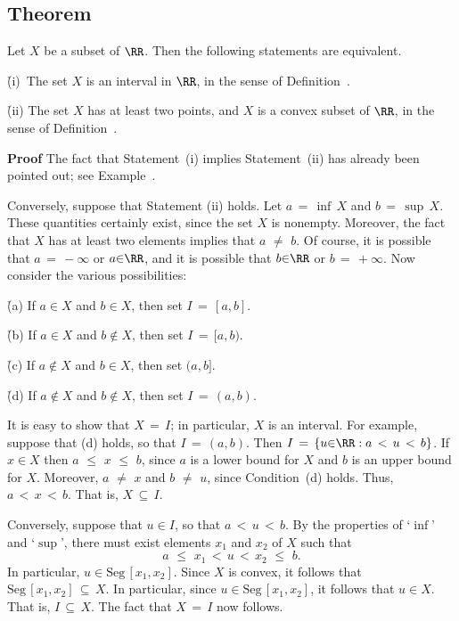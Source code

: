\V

            \subsection{\small{\bf Theorem}}
            \label{ThmB30.160}

\V

        Let $X$ be a subset of ${\RR}$. Then the following statements are equivalent.

        \h (i)\, The set $X$ is an interval in ${\RR}$, in the sense of Definition~.

        \h (ii) The set $X$ has at least two points, and $X$ is a convex subset of ${\RR}$, in the sense of Definition~.

\V

        {\bf Proof} The fact that Statement~(i) implies Statement~(ii) has already been pointed out; see Example~.

        Conversely, suppose that Statement (ii) holds. Let $a \,=\, {\inf}\,X$ and $b \,=\, {\sup}\,X$.
    These quantities certainly exist, since the set $X$ is nonempty. Moreover, the fact that $X$ has at least two elements implies that $a \,\,{\neq}\,\, b$.
    Of course, it is possible that $a \,=\, -{\infty}$ or $a{\in}{\RR}$, and it is possible that $b{\in}{\RR}$ or $b \,=\, +{\infty}$.
    Now consider the various possibilities:

    \h (a) If $a{\in}X$ and $b{\in}X$, then set $I \,=\, [a,b]$.

    \h (b) If $a{\in}X$ and $b \not \in X$, then set $I \,=\, [a,b)$.

    \h (c) If $a \not \in X$ and $b{\in}X$, then set $(a,b]$.

    \h (d) If $a \not \in X$ and $b \not \in X$, then set $I \,=\, (a,b)$.

\noindent It is easy to show that $X \,=\, I$; in particular, $X$ is an interval.
    For example, suppose that (d) holds, so that $I \,=\, (a,b)$. Then $I \,=\, \{u{\in}{\RR}:a\,<\,u\,<\,b\}$.
    If $x{\in}X$ then $a\,\,{\leq}\,\,x\,\,{\leq}\,\,b$, since $a$ is a lower bound for $X$ and $b$ is an upper bound for $X$.
    Moreover, $a \,\,{\neq}\,\, x$ and $b \,\,{\neq}\,\, u$, since Condition~(d) holds.
    Thus, $a\,<\,x\,<\,b$. That is, $X \,{\subseteq}\, I$.

        Conversely, suppose that $u{\in}I$, so that $a\,<\,u\,<\,b$.
    By the properties of `$\inf$' and `$\sup$', there must exist elements $x_{1}$ and $x_{2}$ of $X$ such that
        \begin{displaymath}
        a\,\,{\leq}\,\,x_{1}\,<\,u\,<\,x_{2}\,\,{\leq}\,\,b.
        \end{displaymath}
    In particular, $u{\in}\mbox{Seg}\,[x_{1},x_{2}]$.
    Since $X$ is convex, it follows that $\mbox{Seg}\,[x_{1},x_{2}] \,{\subseteq}\, X$.
    In particular, since $u{\in}\mbox{Seg}\,[x_{1},x_{2}]$, it follows that $u{\in}X$. That is, $I \,{\subseteq}\, X$.
    The fact that $X \,=\, I$ now follows.

